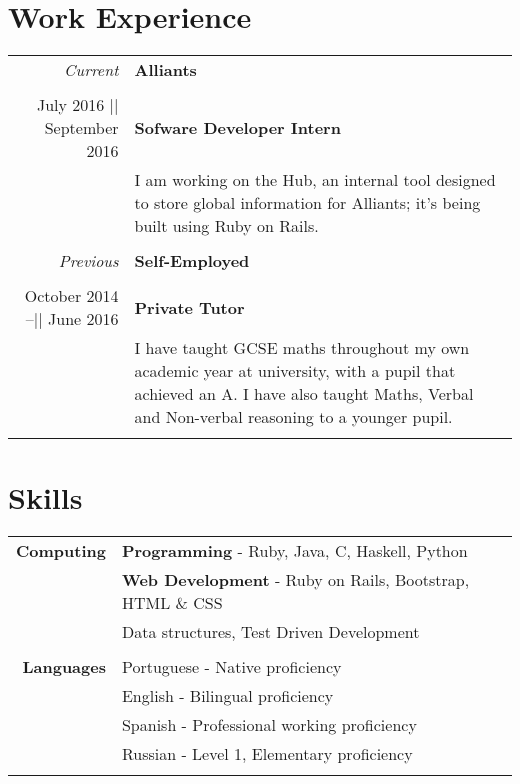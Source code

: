 \documentclass[a4paper,10pt]{article}
\begin{document}
	
	\section*{Work Experience}
		
	\begin{tabular}{ r |p{10cm}}
		
		\large{\textit{Current}} & \textbf{\large{Alliants}}
		\\\multicolumn{0}{c}{} \\
		July 2016 || September 2016 & \textbf{Sofware Developer Intern} \\&I am working on the Hub, an internal tool designed to store global information for Alliants; it’s being built using Ruby on Rails.
		\\\multicolumn{2}{c}{} \\
		
		\large{\textit{Previous}} & \textbf{\large{Self-Employed}}
		\\\multicolumn{0}{c}{} \\		
		 October 2014 –|| June 2016 & \textbf{Private Tutor} \\& I have taught GCSE maths throughout my own academic year at university, with a pupil that achieved an A. I have also taught Maths, Verbal and Non-verbal reasoning to a younger pupil.
		\\\multicolumn{2}{c}{} \\

			
	\end{tabular}
	
	\section*{Skills}
	
	\begin{tabular}{r|p{12cm}}	
		\textbf{Computing}	 & \textbf{Programming} - Ruby, Java, C, Haskell, Python \\&
		\textbf{Web Development} - Ruby on Rails, Bootstrap, HTML \& CSS \\&
		Data structures, Test Driven Development
		 \\\multicolumn{2}{c}{} \\
		\textbf{Languages} & Portuguese - Native proficiency \\&
		English - Bilingual proficiency \\&
		Spanish - Professional working proficiency \\&
		Russian - Level 1, Elementary proficiency \\\multicolumn{2}{c}{} \\

		
	\end{tabular}
	
\end{document}
